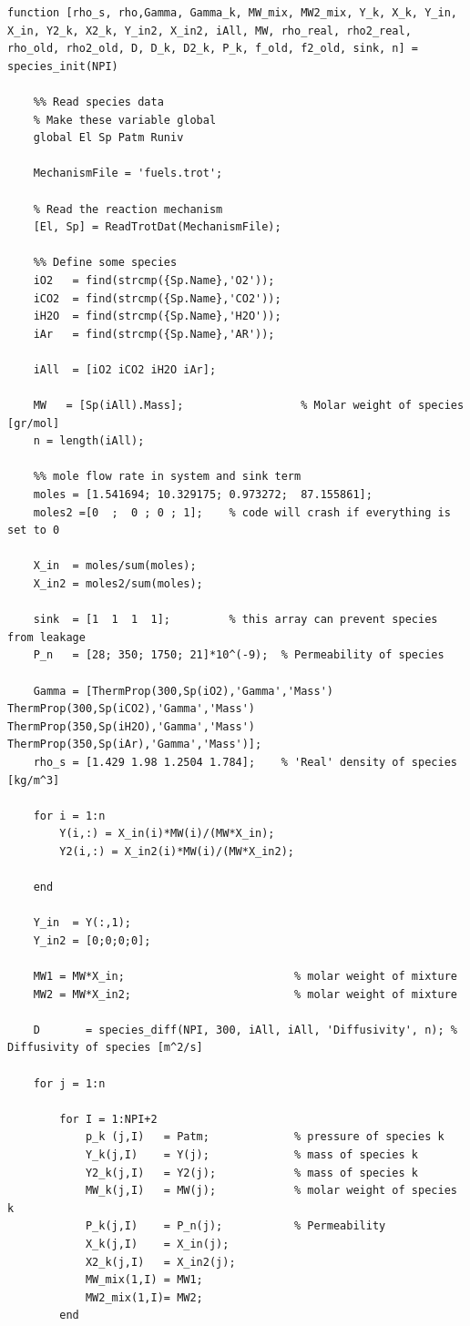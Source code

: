 \begin{lstlisting}
function [rho_s, rho,Gamma, Gamma_k, MW_mix, MW2_mix, Y_k, X_k, Y_in, X_in, Y2_k, X2_k, Y_in2, X_in2, iAll, MW, rho_real, rho2_real, rho_old, rho2_old, D, D_k, D2_k, P_k, f_old, f2_old, sink, n] = species_init(NPI)

	%% Read species data
	% Make these variable global
	global El Sp Patm Runiv

	MechanismFile = 'fuels.trot';

	% Read the reaction mechanism
	[El, Sp] = ReadTrotDat(MechanismFile);

	%% Define some species
	iO2   = find(strcmp({Sp.Name},'O2'));
	iCO2  = find(strcmp({Sp.Name},'CO2'));
	iH2O  = find(strcmp({Sp.Name},'H2O'));
	iAr   = find(strcmp({Sp.Name},'AR'));

	iAll  = [iO2 iCO2 iH2O iAr];

	MW   = [Sp(iAll).Mass];                  % Molar weight of species [gr/mol]
	n = length(iAll);

	%% mole flow rate in system and sink term
	moles = [1.541694; 10.329175; 0.973272;  87.155861];
	moles2 =[0  ;  0 ; 0 ; 1];    % code will crash if everything is set to 0

	X_in  = moles/sum(moles);
	X_in2 = moles2/sum(moles); 

	sink  = [1  1  1  1];         % this array can prevent species from leakage
	P_n   = [28; 350; 1750; 21]*10^(-9);  % Permeability of species

	Gamma = [ThermProp(300,Sp(iO2),'Gamma','Mass') ThermProp(300,Sp(iCO2),'Gamma','Mass') ThermProp(350,Sp(iH2O),'Gamma','Mass') ThermProp(350,Sp(iAr),'Gamma','Mass')];
	rho_s = [1.429 1.98 1.2504 1.784];    % 'Real' density of species [kg/m^3]

	for i = 1:n
		Y(i,:) = X_in(i)*MW(i)/(MW*X_in);                
		Y2(i,:) = X_in2(i)*MW(i)/(MW*X_in2);

	end

	Y_in  = Y(:,1);
	Y_in2 = [0;0;0;0];

	MW1 = MW*X_in;                          % molar weight of mixture    
	MW2 = MW*X_in2;                         % molar weight of mixture    

	D       = species_diff(NPI, 300, iAll, iAll, 'Diffusivity', n); % Diffusivity of species [m^2/s]

	for j = 1:n

		for I = 1:NPI+2
			p_k (j,I)   = Patm;             % pressure of species k
			Y_k(j,I)    = Y(j);             % mass of species k
			Y2_k(j,I)   = Y2(j);            % mass of species k
			MW_k(j,I)   = MW(j);            % molar weight of species k
			P_k(j,I)    = P_n(j);           % Permeability
			X_k(j,I)    = X_in(j);
			X2_k(j,I)   = X_in2(j);
			MW_mix(1,I) = MW1;
			MW2_mix(1,I)= MW2;
		end


\end{lstlisting}
